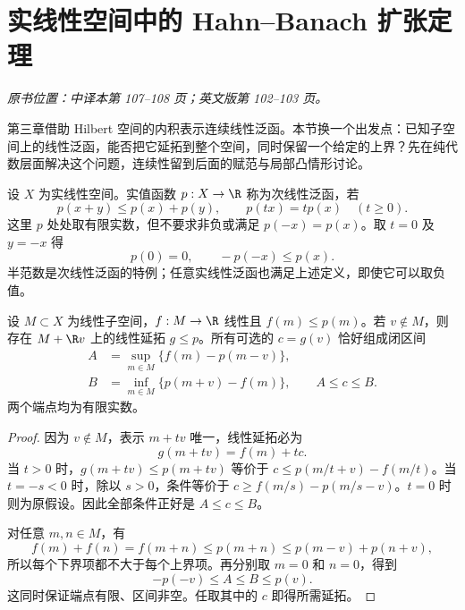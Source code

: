 \section{实线性空间中的 Hahn--Banach 扩张定理}\label{sec:yosida-04-01}
\noindent\textit{原书位置：中译本第 107--108 页；英文版第 102--103 页。}

第三章借助 Hilbert 空间的内积表示连续线性泛函。本节换一个出发点：已知子空间上的线性泛函，能否把它延拓到整个空间，同时保留一个给定的上界？先在纯代数层面解决这个问题，连续性留到后面的赋范与局部凸情形讨论。

\begin{definition}[次线性泛函]\label{def:y4-sublinear}
设 $X$ 为实线性空间。实值函数 $p:X\to\R$ 称为次线性泛函，若
\[
 p(x+y)\le p(x)+p(y),\qquad p(tx)=tp(x)\quad(t\ge0).
\]
这里 $p$ 处处取有限实数，但不要求非负或满足 $p(-x)=p(x)$。取 $t=0$ 及 $y=-x$ 得
\[
 p(0)=0,\qquad -p(-x)\le p(x).
\]
半范数是次线性泛函的特例；任意实线性泛函也满足上述定义，即使它可以取负值。
\end{definition}

\begin{lemma}[一次增加一个方向]\label{lem:y4-one-step}
设 $M\subset X$ 为线性子空间，$f:M\to\R$ 线性且 $f(m)\le p(m)$。若 $v\notin M$，则存在 $M+\R v$ 上的线性延拓 $g\le p$。所有可选的 $c=g(v)$ 恰好组成闭区间
\[
 \begin{aligned}
 A&=\sup_{m\in M}\{f(m)-p(m-v)\},\\
 B&=\inf_{m\in M}\{p(m+v)-f(m)\},\qquad A\le c\le B.
 \end{aligned}
\]
两个端点均为有限实数。
\end{lemma}
\begin{proof}
因为 $v\notin M$，表示 $m+tv$ 唯一，线性延拓必为
\[
 g(m+tv)=f(m)+tc.
\]
当 $t>0$ 时，$g(m+tv)\le p(m+tv)$ 等价于
$c\le p(m/t+v)-f(m/t)$。当 $t=-s<0$ 时，除以 $s>0$，条件等价于
$c\ge f(m/s)-p(m/s-v)$。$t=0$ 时则为原假设。因此全部条件正好是 $A\le c\le B$。

对任意 $m,n\in M$，有
\[
 f(m)+f(n)=f(m+n)\le p(m+n)\le p(m-v)+p(n+v),
\]
所以每个下界项都不大于每个上界项。再分别取 $m=0$ 和 $n=0$，得到
\[
 -p(-v)\le A\le B\le p(v).
\]
这同时保证端点有限、区间非空。任取其中的 $c$ 即得所需延拓。
\end{proof}

